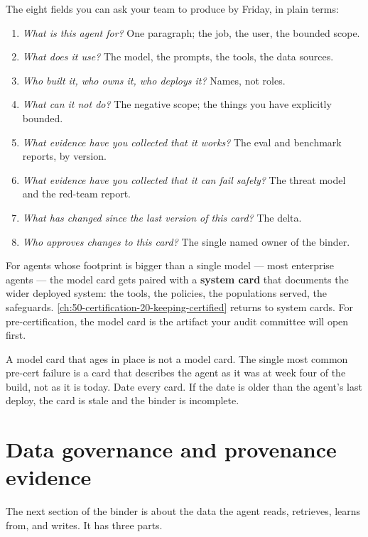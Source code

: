 The eight fields you can ask your team to produce by Friday, in plain terms:

\begin{enumerate}
\item \textit{What is this agent for?} One paragraph; the job, the user, the bounded scope.
\item \textit{What does it use?} The model, the prompts, the tools, the data sources.
\item \textit{Who built it, who owns it, who deploys it?} Names, not roles.
\item \textit{What can it not do?} The negative scope; the things you have explicitly bounded.
\item \textit{What evidence have you collected that it works?} The eval and benchmark reports, by version.
\item \textit{What evidence have you collected that it can fail safely?} The threat model and the red-team report.
\item \textit{What has changed since the last version of this card?} The delta.
\item \textit{Who approves changes to this card?} The single named owner of the binder.
\end{enumerate}

For agents whose footprint is bigger than a single model --- most enterprise agents --- the model card gets paired with a \textbf{system card} that documents the wider deployed system: the tools, the policies, the populations served, the safeguards. \autoref{ch:50-certification-20-keeping-certified} returns to system cards. For pre-certification, the model card is the artifact your audit committee will open first.

\begin{TNwarning} A model card that ages in place is not a model card. The single most common pre-cert failure is a card that describes the agent as it was at week four of the build, not as it is today. Date every card. If the date is older than the agent's last deploy, the card is stale and the binder is incomplete. \end{TNwarning}

\section{Data governance and provenance evidence}

The next section of the binder is about the data the agent reads, retrieves, learns from, and writes. It has three parts.

